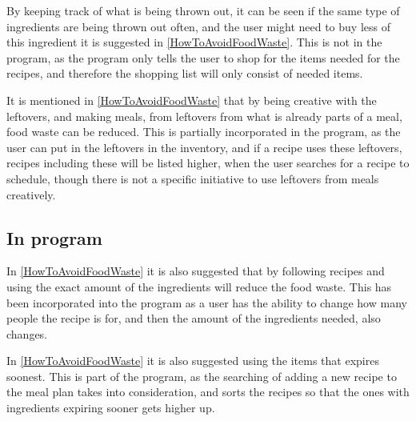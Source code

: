 By keeping track of what is being thrown out, it can be seen if the same type of ingredients are being thrown out often, and the user might need to buy less of this ingredient it is suggested in \cref{HowToAvoidFoodWaste}. This is not in the program, as the program only tells the user to shop for the items needed for the recipes, and therefore the shopping list will only consist of needed items. 

It is mentioned in \cref{HowToAvoidFoodWaste} that by being creative with the leftovers, and making meals, from leftovers from what is already parts of a meal, food waste can be reduced. This is partially incorporated in the program, as the user can put in the leftovers in the inventory, and if a recipe uses these leftovers, recipes including these will be listed higher, when the user searches for a recipe to schedule, though there is not a specific initiative to use leftovers from meals creatively.



\subsection{In program}

In \cref{HowToAvoidFoodWaste} it is also suggested that by following recipes and using the exact amount of the ingredients will reduce the food waste. This has been incorporated into the program as a user has the ability to change how many people the recipe is for, and then the amount of the ingredients needed, also changes.

In \cref{HowToAvoidFoodWaste} it is also suggested using the items that expires soonest. This is part of the program, as the searching of adding a new recipe to the meal plan takes into consideration, and sorts the recipes so that the ones with ingredients expiring sooner gets higher up.